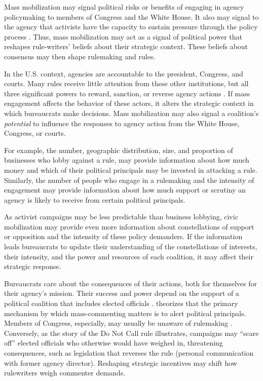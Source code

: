 Mass mobilization may signal political risks or benefits of engaging in agency policymaking to members of Congress and the White House. It also may signal to the agency that activists have the capacity to sustain pressure through the policy process \citep{Coglianese2001}. %
Thus, mass mobilization may act as a signal of political power that reshapes rule-writers' beliefs about their strategic context. These beliefs about consensus may then shape rulemaking and rules.


In the U.S. context, agencies are accountable to the president, Congress, and courts. Many rules receive little attention from these other institutions, but all three significant powers to reward, sanction, or reverse agency actions \citep{Yaver2016}. If mass engagement affects the behavior of these actors, it alters the strategic context in which bureaucrats make decisions.
Mass mobilization may also signal a coalition's \textit{potential} to influence the responses to agency action from the White House, Congress, or courts. 

For example, the number, geographic distribution, size, and proportion of businesses who lobby against a rule, may provide information about how much money and which of their political principals may be invested in attacking a rule. Similarly, the number of people who engage in a rulemaking and the intensity of engagement may provide information about how much support or scrutiny an agency is likely to receive from certain political principals. 

As activist campaigns may be less predictable than business lobbying, civic mobilization may provide even more information about constellations of support or opposition and the intensity of these policy demanders. 
If the information leads bureaucrats to update their understanding of the constellations of interests, their intensity, and the power and resources of each coalition, it may affect their strategic response.

Bureaucrats care about the consequences of their actions, both for themselves for their agency’s mission. Their success and power depend on the support of a political coalition that includes elected officials \citep{Carpenter2001}. \citet{West2004} theorizes that the primary mechanism by which mass-commenting matters is to alert political principals. Members of Congress, especially, may usually be unaware of rulemaking \citep{Nou2016}. Conversely, as the story of the Do Not Call rule illustrates, campaigns may ``scare off'' elected officials who otherwise would have weighed in, threatening consequences, such as legislation that reverses the rule (personal communication with former agency director).
Reshaping strategic incentives may shift how rulewriters weigh commenter demands.



